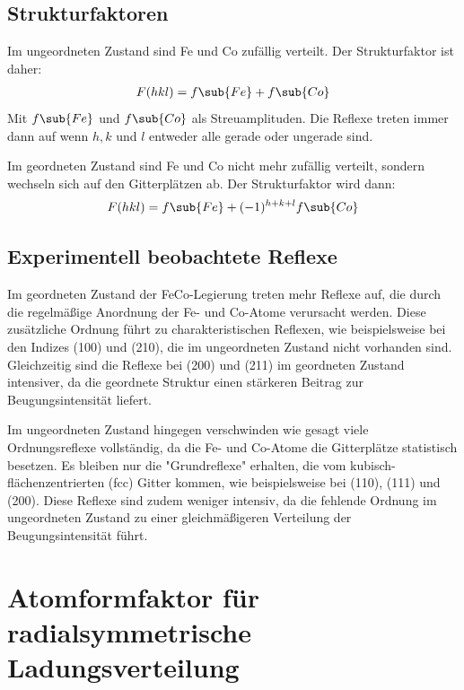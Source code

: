 \documentclass[exa]{exercise_5.0}
\begin{document}
\subsection{Strukturfaktoren}
Im ungeordneten Zustand sind Fe und Co zufällig verteilt. Der Strukturfaktor ist daher:
\begin{align*}
    F(hkl) = f\sub{Fe} + f\sub{Co}
\end{align*}
Mit $f\sub{Fe}$ und $f\sub{Co}$ als Streuamplituden. Die Reflexe treten immer dann auf wenn $h,k$ und $l$ entweder alle gerade oder ungerade sind.

Im geordneten Zustand sind Fe und Co nicht mehr zufällig verteilt, sondern wechseln sich auf den Gitterplätzen ab. Der Strukturfaktor wird dann:
\begin{align*}
    F(hkl) = f\sub{Fe} + (-1)^{h+k+l}f\sub{Co}
\end{align*}

\subsection{Experimentell beobachtete Reflexe}
Im geordneten Zustand der FeCo-Legierung treten mehr Reflexe auf, die durch die regelmäßige Anordnung der Fe- und Co-Atome verursacht werden. Diese zusätzliche Ordnung führt zu charakteristischen Reflexen, wie beispielsweise bei den Indizes (100) und (210), die im ungeordneten Zustand nicht vorhanden sind. Gleichzeitig sind die Reflexe bei (200) und (211) im geordneten Zustand intensiver, da die geordnete Struktur einen stärkeren Beitrag zur Beugungsintensität liefert.

Im ungeordneten Zustand hingegen verschwinden wie gesagt viele Ordnungsreflexe vollständig, da die Fe- und Co-Atome die Gitterplätze statistisch besetzen. Es bleiben nur die "Grundreflexe"{} erhalten, die vom kubisch-flächenzentrierten (fcc) Gitter kommen, wie beispielsweise bei (110), (111) und (200). Diese Reflexe sind zudem weniger intensiv, da die fehlende Ordnung im ungeordneten Zustand zu einer gleichmäßigeren Verteilung der Beugungsintensität führt.

\section{Atomformfaktor für radialsymmetrische Ladungsverteilung}
\end{document}
